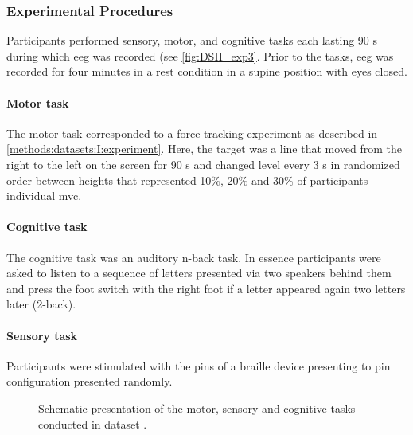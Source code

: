 \subsubsection{Experimental Procedures}
\label{methods:datasets:II:experiment}
Participants performed sensory, motor, and cognitive tasks each lasting 90 s during which \gls{eeg} was recorded (see \autoref{fig:DSII_exp3}. Prior to the tasks, \gls{eeg} was recorded for four minutes in a rest condition in a supine position with eyes closed. 
\paragraph{Motor task} 
The motor task corresponded to a force tracking experiment as described in \autoref{methods:datasets:I:experiment}. Here, the target was a line that moved from the right to the left on the screen for 90 s and changed level every 3 s in randomized order between heights that represented 10\%, 20\% and 30\% of participants individual \gls{mvc}.
\paragraph{Cognitive task}
The cognitive task was an auditory n-back task. In essence participants were asked to listen to a sequence of letters presented via two speakers behind them and press the foot switch with the right foot if a letter appeared again two letters later (2-back).
\paragraph{Sensory task}
Participants were stimulated with the pins of a braille device presenting to pin configuration presented randomly. 

\begin{figure}[h]
\begin{center}

\caption[Schematic presentation of the motor, sensory and cognitive tasks conducted in dataset .]{Schematic presentation of the motor, sensory and cognitive tasks conducted in dataset .}
\label{fig:DSII_exp3}
\end{center}
\end{figure}


